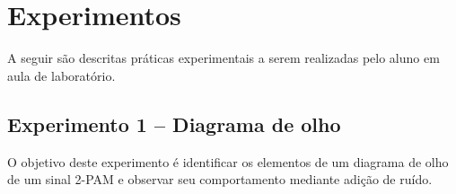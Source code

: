 \documentclass[12pt,addpoints]{exam}
\begin{document}

\section{Experimentos}

A seguir são descritas práticas experimentais a serem realizadas pelo aluno em aula de laboratório. 

\subsection{Experimento 1 -- Diagrama de olho}

O objetivo deste experimento é identificar os elementos de um diagrama de olho de um sinal 2-PAM e observar seu comportamento mediante adição de ruído.
\end{document}
